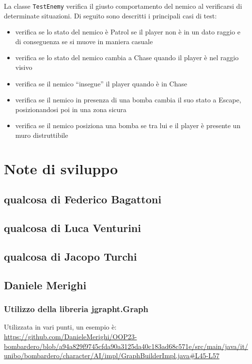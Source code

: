 \documentclass[a4paper,12pt]{report}
\begin{document}
\par
La classe \texttt{TestEnemy} verifica il giusto comportamento del nemico al verificarsi di determinate situazioni. Di seguito sono descritti i principali casi di test:
\begin{itemize}
    \item verifica se lo stato del nemico è Patrol se il player non è in un dato raggio e di conseguenza se si muove in maniera casuale
    \item verifica se lo stato del nemico cambia a Chase quando il player è nel raggio visivo
    \item verifica se il nemico “insegue” il player quando è in Chase
    \item verifica se il nemico in presenza di una bomba cambia il suo stato a Escape, posizionandosi poi in una zona sicura
    \item verifica se il nemico posiziona una bomba se tra lui e il player è presente un muro distruttibile
\end{itemize}

\section{Note di sviluppo}

\subsection{qualcosa di Federico Bagattoni}
\subsection{qualcosa di Luca Venturini}
\subsection{qualcosa di Jacopo Turchi}
\subsection{Daniele Merighi}
\par
\subsubsection{Utilizzo della libreria jgrapht.Graph}
Utilizzata in vari punti, un esempio è:
\url{https://github.com/DanieleMerighi/OOP23-bombardero/blob/a94a829f9745cfda90a3125da40c183ad68c571e/src/main/java/it/unibo/bombardero/character/AI/impl/GraphBuilderImpl.java#L45-L57}
\end{document}
